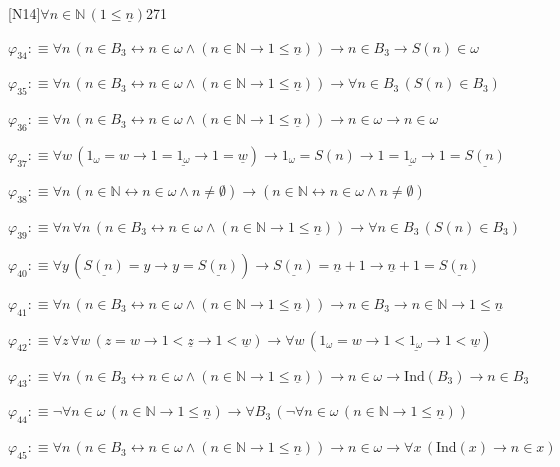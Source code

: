 \begin{fullproof}{[N14]}{$\forall n \in \mathbb{N}\,(1 \leq \underline{n})$}{271}
\begin{abbrevlist}
\item $\varphi_{34} :\equiv \forall n\,(n \in B_{3} \leftrightarrow n \in \omega \land (n \in \mathbb{N} \to 1 \leq \underline{n})) \to n \in B_{3} \to S(n) \in \omega$
\item $\varphi_{35} :\equiv \forall n\,(n \in B_{3} \leftrightarrow n \in \omega \land (n \in \mathbb{N} \to 1 \leq \underline{n})) \to \forall n \in B_{3}\,(S(n) \in B_{3})$
\item $\varphi_{36} :\equiv \forall n\,(n \in B_{3} \leftrightarrow n \in \omega \land (n \in \mathbb{N} \to 1 \leq \underline{n})) \to n \in \omega \to n \in \omega$
\item $\varphi_{37} :\equiv \forall w\,(1_{\omega} = w \to 1 = \underline{1_{\omega}} \to 1 = \underline{w}) \to 1_{\omega} = S(n) \to 1 = \underline{1_{\omega}} \to 1 = \underline{S(n)}$
\item $\varphi_{38} :\equiv \forall n\,(n \in \mathbb{N} \leftrightarrow n \in \omega \land n \neq \emptyset) \to (n \in \mathbb{N} \leftrightarrow n \in \omega \land n \neq \emptyset)$
\item $\varphi_{39} :\equiv \forall n\,\forall n\,(n \in B_{3} \leftrightarrow n \in \omega \land (n \in \mathbb{N} \to 1 \leq \underline{n})) \to \forall n \in B_{3}\,(S(n) \in B_{3})$
\item $\varphi_{40} :\equiv \forall y\,(\underline{S(n)} = y \to y = \underline{S(n)}) \to \underline{S(n)} = \underline{n} + 1 \to \underline{n} + 1 = \underline{S(n)}$
\item $\varphi_{41} :\equiv \forall n\,(n \in B_{3} \leftrightarrow n \in \omega \land (n \in \mathbb{N} \to 1 \leq \underline{n})) \to n \in B_{3} \to n \in \mathbb{N} \to 1 \leq \underline{n}$
\item $\varphi_{42} :\equiv \forall z\,\forall w\,(z = w \to 1 < \underline{z} \to 1 < \underline{w}) \to \forall w\,(1_{\omega} = w \to 1 < \underline{1_{\omega}} \to 1 < \underline{w})$
\item $\varphi_{43} :\equiv \forall n\,(n \in B_{3} \leftrightarrow n \in \omega \land (n \in \mathbb{N} \to 1 \leq \underline{n})) \to n \in \omega \to \mathrm{Ind}(B_{3}) \to n \in B_{3}$
\item $\varphi_{44} :\equiv \neg \forall n \in \omega\,(n \in \mathbb{N} \to 1 \leq \underline{n}) \to \forall B_{3}\,(\neg \forall n \in \omega\,(n \in \mathbb{N} \to 1 \leq \underline{n}))$
\item $\varphi_{45} :\equiv \forall n\,(n \in B_{3} \leftrightarrow n \in \omega \land (n \in \mathbb{N} \to 1 \leq \underline{n})) \to n \in \omega \to \forall x\,(\mathrm{Ind}(x) \to n \in x)$

\end{abbrevlist}
\end{fullproof}
